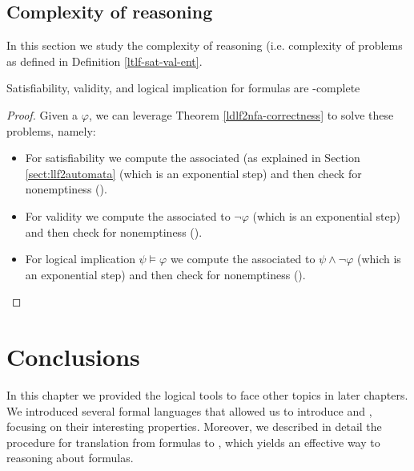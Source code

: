 \subsection{Complexity of \LLf reasoning}
In this section we study the complexity of \LLf reasoning (i.e. complexity of problems as defined in Definition \ref{ltlf-sat-val-ent}.

\begin{theorem} Satisfiability, validity, and logical implication for \LDLf formulas are \PSPACE-complete
\end{theorem}
\begin{proof}
	Given a \LLf $\varphi$, we can leverage Theorem \ref{ldlf2nfa-correctness} to solve these problems, namely:
	\begin{itemize}
		\item For \LLf satisfiability we compute the associated \NFA (as explained in Section \ref{sect:llf2automata} (which is an exponential step) and then check \NFA for nonemptiness (\NLOGSPACE).
		\item For \LLf validity we compute the \NFA associated to $\lnot \varphi$ (which is an exponential step) and then check \NFA for nonemptiness (\NLOGSPACE).
		\item For \LLf logical implication $\psi \models \varphi$ we compute the \NFA associated to $\psi \wedge \lnot \varphi$ (which is an exponential step) and then check \NFA for nonemptiness (\NLOGSPACE).
	\end{itemize}
\end{proof}
\section{Conclusions}
In this chapter we provided the logical tools to face other topics in later chapters. We introduced several formal languages that allowed us to introduce \LTLf and \LDLf, focusing on their interesting properties. Moreover, we described in detail the procedure for translation from \LLf formulas to \DFAs, which yields an effective way to reasoning about \LLf formulas.
